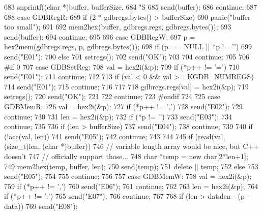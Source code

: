\begin{DoxyCode}
{{{683             snprintf((char *)buffer, bufferSize,
684                     "S%
685             send(buffer);
686             continue;
687 
688           case GDBRegR:
689             if (2 * gdbregs.bytes() > bufferSize)
690                 panic("buffer too small");
691 
692             mem2hex(buffer, gdbregs.regs, gdbregs.bytes());
693             send(buffer);
694             continue;
695 
696           case GDBRegW:
697             p = hex2mem(gdbregs.regs, p, gdbregs.bytes());
698             if (p == NULL || *p != '\0')
699                 send("E01");
700             else {
701                 setregs();
702                 send("OK");
703             }
704             continue;
705 
706 #if 0
707           case GDBSetReg:
708             val = hex2i(&p);
709             if (*p++ != '=') {
710                 send("E01");
711                 continue;
712             }
713             if (val < 0 && val >= KGDB_NUMREGS) {
714                 send("E01");
715                 continue;
716             }
717 
718             gdbregs.regs[val] = hex2i(&p);
719             setregs();
720             send("OK");
721 
722             continue;
723 #endif
724 
725           case GDBMemR:
726             val = hex2i(&p);
727             if (*p++ != ',') {
728                 send("E02");
729                 continue;
730             }
731             len = hex2i(&p);
732             if (*p != '\0') {
733                 send("E03");
734                 continue;
735             }
736             if (len > bufferSize) {
737                 send("E04");
738                 continue;
739             }
740             if (!acc(val, len)) {
741                 send("E05");
742                 continue;
743             }
744 
745             if (read(val, (size_t)len, (char *)buffer)) {
746                // variable length array would be nice, but C++ doesn't
747                // officially support those...
748                char *temp = new char[2*len+1];
749                mem2hex(temp, buffer, len);
750                send(temp);
751                delete [] temp;
752             } else {
753                send("E05");
754             }
755             continue;
756 
757           case GDBMemW:
758             val = hex2i(&p);
759             if (*p++ != ',') {
760                 send("E06");
761                 continue;
762             }
763             len = hex2i(&p);
764             if (*p++ != ':') {
765                 send("E07");
766                 continue;
767             }
768             if (len > datalen - (p - data)) {
769                 send("E08");
}}}}
\end{DoxyCode}
